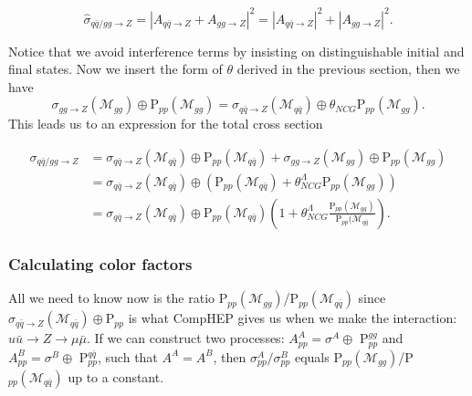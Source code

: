 \begin{equation}
\hat \sigma_{q \bar q/gg \rightarrow Z} = |A_{q \bar q \rightarrow Z} + A_{gg \rightarrow Z}|^{2}=|A_{q \bar q \rightarrow Z}|^{2}+|A_{gg \rightarrow Z}|^{2}.
\end{equation}

Notice that we avoid interference terms by insisting on distinguishable initial and final states. Now we insert the form of $\theta$ derived in the previous section, then we have
\begin{equation}
	\sigma_{gg\rightarrow Z} (\mathcal{M}_{gg}) \oplus \textrm{P}_{pp}(\mathcal{M}_{gg})=\sigma_{q \bar q\rightarrow Z}(\mathcal{M}_{q \bar q}) \oplus \theta_{NCG}\textrm{P}_{pp}(\mathcal{M}_{gg}).
\end{equation}
This leads us to an expression for the total cross section

\begin{align} \label{eq:qqggztotal}
\sigma_{q \bar q/gg \rightarrow Z} &= \sigma_{q \bar q \rightarrow Z} (\mathcal{M}_{q \bar q}) \oplus \textrm{P}_{pp}(\mathcal{M}_{q \bar q})+ \sigma_{gg\rightarrow Z} (\mathcal{M}_{gg}) \oplus \textrm{P}_{pp}(\mathcal{M}_{gg})\nonumber \\ 
&= \sigma_{q \bar q\rightarrow Z}(\mathcal{M}_{q \bar q}) \oplus (\textrm{P}_{pp}(\mathcal{M}_{q \bar q})+\theta_{NCG}^{\Lambda}\textrm{P}_{pp}(\mathcal{M}_{gg}))\nonumber \\ 
&= \sigma_{q \bar q\rightarrow Z}(\mathcal{M}_{q \bar q}) \oplus \textrm{P}_{pp}(\mathcal{M}_{q \bar q}) \left ( 1+\theta_{NCG}^{\Lambda}\frac{\textrm{P}_{pp}(\mathcal{M}_{gg})}{\textrm{P}_{pp}(\mathcal{M}_{q \bar q}} \right ).
\end{align}

\subsubsection{Calculating color factors}

All we need to know now is the ratio P$_{pp}(\mathcal{M}_{gg})$/P$_{pp}(\mathcal{M}_{q \bar q})$ since $ \sigma_{q \bar q\rightarrow Z}(\mathcal{M}_{q \bar q}) \oplus \textrm{P}_{pp}$ is what CompHEP gives us when we make the interaction: $u \bar u \rightarrow Z \rightarrow \mu \bar \mu $. If we can construct two processes: $A_{pp}^{A}=\sigma^{A} \oplus$ P$_{pp}^{gg}$ and $A_{pp}^{B}=\sigma^{B} \oplus$ P$_{pp}^{q \bar q}$, such that $A^{A}=A^{B}$, then $\sigma_{pp}^{A}/\sigma_{pp}^{B}$ equals  P$_{pp}(\mathcal{M}_{gg})$/P$_{pp}(\mathcal{M}_{q \bar q})$ up to a constant.

